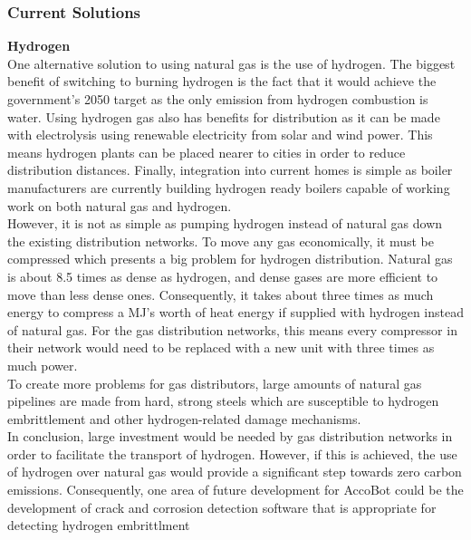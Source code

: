 \documentclass[11pt]{article}		%
\begin{document}
            \subsubsection[Current Solutions]{Current Solutions}
            \textbf{Hydrogen} \\
            One alternative solution to using natural gas is the use of hydrogen. The biggest benefit of switching to burning hydrogen is the fact that it would achieve the government's 2050 target as the only emission from hydrogen combustion is water. Using hydrogen gas also has benefits for distribution as it can be made with electrolysis using renewable electricity from solar and wind power. This means hydrogen plants can be placed nearer to cities in order to reduce distribution distances. Finally, integration into current homes is simple as boiler manufacturers are currently building hydrogen ready boilers capable of working work on both natural gas and hydrogen.\\
            \hspace*{3ex}However, it is not as simple as pumping hydrogen instead of natural gas down the existing distribution networks. To move any gas economically, it must be compressed which presents a big problem for hydrogen distribution. Natural gas is about 8.5 times as dense as hydrogen, and dense gases are more efficient to move than less dense ones. Consequently, it takes about three times as much energy to compress a MJ’s worth of heat energy if supplied with hydrogen instead of natural gas. For the gas distribution networks, this means every compressor in their network would need to be replaced with a new unit with three times as much power.\\
            \hspace*{3ex}To create more problems for gas distributors, large amounts of natural gas pipelines are made from hard, strong steels which are susceptible to hydrogen embrittlement and other hydrogen-related damage mechanisms.\\
            \hspace*{3ex}In conclusion, large investment would be needed by gas distribution networks in order to facilitate the transport of hydrogen. However, if this is achieved, the use of hydrogen over natural gas would provide a significant step towards zero carbon emissions. Consequently, one area of future development for AccoBot could be the development of crack and corrosion detection software that is appropriate for detecting hydrogen embrittlment  \\ 
            
\end{document}
